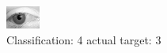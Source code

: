 \begin{figure}[h!]
\begin{center}
\includegraphics[width=0.60\columnwidth]{figures/ID2785_class_4_target_3.png}
\end{center}
\caption{ Classification: 4 actual target: 3}
\label{fig:ID2785_class_4_target_3}
\end{figure}
